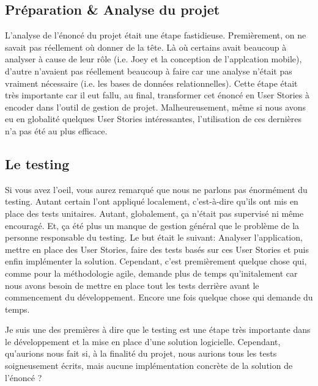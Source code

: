 \subsection{Préparation \& Analyse du projet}

L'analyse de l'énoncé du projet était une étape fastidieuse. Premièrement, on ne savait pas réellement où donner de la tête. Là où certains avait beaucoup à analyser à cause de leur rôle (i.e. Joey et la conception de l'applcation mobile), d'autre n'avaient pas réellement beaucoup à faire car une analyse n'était pas vraiment nécessaire (i.e. les bases de données relationnelles). Cette étape était très importante car il eut fallu, au final, transformer cet énoncé en User Stories à encoder dans l'outil de gestion de projet. Malheureusement, même si nous avons eu en globalité quelques User Stories intéressantes, l'utilisation de ces dernières n'a pas été au plus efficace.

\subsection{Le testing}

Si vous avez l'oeil, vous aurez remarqué que nous ne parlons pas énormément du testing. Autant certain l'ont appliqué localement, c'est-à-dire qu'ils ont mis en place des tests unitaires. Autant, globalement, ça n'était pas supervisé ni même encouragé. Et, ça été plus un manque de gestion général que le problème de la personne responsable du testing. Le but était le suivant: Analyser l'application, mettre en place des User Stories, faire des tests basés sur ces User Stories et puis enfin implémenter la solution. Cependant, c'est premièrement quelque chose qui, comme pour la méthodologie agile, demande plus de temps qu'initalement car nous avons besoin de mettre en place tout les tests derrière avant le commencement du développement. Encore une fois quelque chose qui demande du temps.

Je suis une des premières à dire que le testing est une étape très importante dans le développement et la mise en place d'une solution logicielle. Cependant, qu'aurions nous fait si, à la finalité du projet, nous aurions tous les tests soigneusement écrits, mais aucune implémentation concrète de la solution de l'énoncé ?

